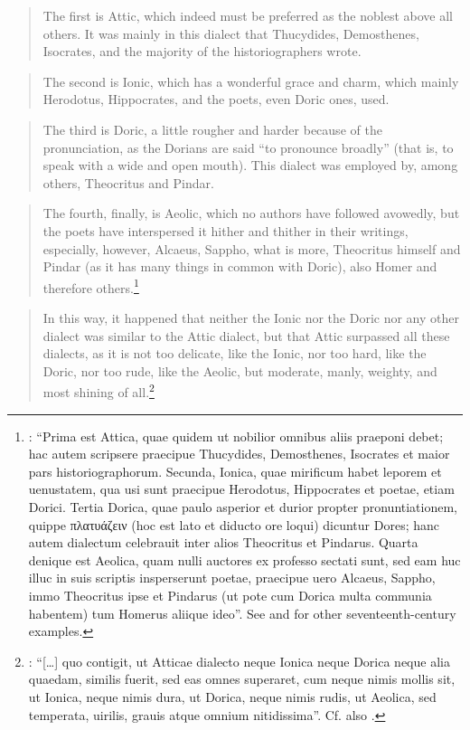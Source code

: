 \begin{quote}
The first is Attic, which indeed must be preferred as the noblest above all others. It was mainly in this dialect that Thucydides, Demosthenes, Isocrates, and the majority of the historiographers wrote.
\end{quote}

\begin{quote}
The second is Ionic, which has a wonderful grace and charm, which mainly Herodotus, Hippocrates, and the poets, even Doric ones, used.
\end{quote}

\begin{quote}
The third is Doric, a little rougher and harder because of the pronunciation, as the Dorians are said “to pronounce broadly” (that is, to speak with a wide and open mouth). This dialect was employed by, among others, Theocritus and Pindar.
\end{quote}

\begin{quote}
The fourth, finally, is Aeolic, which no authors have followed avowedly, but the poets have interspersed it hither and thither in their writings, especially, however, Alcaeus, Sappho, what is more, Theocritus himself and Pindar (as it has many things in common with Doric), also Homer and therefore others.\footnote{\citet[2--3]{Merigon1621}: “Prima est Attica, quae quidem ut nobilior omnibus aliis praeponi debet; hac autem scripsere praecipue Thucydides, Demosthenes, Isocrates et maior pars historiographorum. Secunda, Ionica, quae mirificum habet leporem et uenustatem, qua usi sunt praecipue Herodotus, Hippocrates et poetae, etiam Dorici. Tertia Dorica, quae paulo asperior et durior propter pronuntiationem, quippe πλατυάζειν (hoc est lato et diducto ore loqui) dicuntur Dores; hanc autem dialectum celebrauit inter alios Theocritus et Pindarus. Quarta denique est Aeolica, quam nulli auctores ex professo sectati sunt, sed eam huc illuc in suis scriptis insperserunt poetae, praecipue uero Alcaeus, Sappho, immo Theocritus ipse et Pindarus (ut pote cum Dorica multa communia habentem) tum Homerus aliique ideo”. See \citet{Hoius1620} and \citet{Rhenius1626} for other seventeenth-century examples.}
\end{quote}

\begin{quote}
In this way, it happened that neither the Ionic nor the Doric nor any other dialect was similar to the Attic dialect, but that Attic surpassed all these dialects, as it is not too delicate, like the Ionic, nor too hard, like the Doric, nor too rude, like the Aeolic, but moderate, manly, weighty, and most shining of all.\footnote{\citet[6]{Georgi1729}: “[…] quo contigit, ut Atticae dialecto neque Ionica neque Dorica neque alia quaedam, similis fuerit, sed eas omnes superaret, cum neque nimis mollis sit, ut Ionica, neque nimis dura, ut Dorica, neque nimis rudis, ut Aeolica, sed temperata, uirilis, grauis atque omnium nitidissima”. Cf. also \citet[197--199]{Ries1786}.}
\end{quote}

